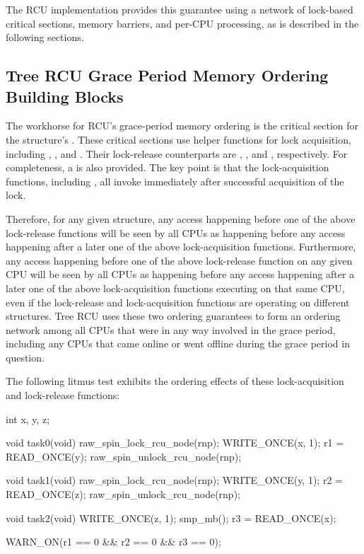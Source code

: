 The RCU implementation provides this guarantee using a network
of lock-based critical sections, memory barriers, and per-CPU
processing, as is described in the following sections.

\subsection{Tree RCU Grace Period Memory Ordering Building Blocks}

The workhorse for RCU's grace-period memory ordering is the
critical section for the  structure's
.
These critical sections use helper functions for lock
acquisition, including ,
, and .
Their lock-release counterparts are ,
, and
, respectively.
For completeness, a  is also provided.
The key point is that the lock-acquisition functions, including
, all invoke 
immediately after successful acquisition of the lock.

Therefore, for any given  structure, any access
happening before one of the above lock-release functions will be seen
by all CPUs as happening before any access happening after a later
one of the above lock-acquisition functions.
Furthermore, any access happening before one of the
above lock-release function on any given CPU will be seen by all
CPUs as happening before any access happening after a later one
of the above lock-acquisition functions executing on that same CPU,
even if the lock-release and lock-acquisition functions are operating
on different  structures.
Tree RCU uses these two ordering guarantees to form an ordering
network among all CPUs that were in any way involved in the grace
period, including any CPUs that came online or went offline during
the grace period in question.

The following litmus test exhibits the ordering effects of these
lock-acquisition and lock-release functions:

\begin{VerbatimN}
	int x, y, z;

	void task0(void)
	{
		raw_spin_lock_rcu_node(rnp);
		WRITE_ONCE(x, 1);
		r1 = READ_ONCE(y);
		raw_spin_unlock_rcu_node(rnp);
	}

	void task1(void)
	{
		raw_spin_lock_rcu_node(rnp);
		WRITE_ONCE(y, 1);
		r2 = READ_ONCE(z);
		raw_spin_unlock_rcu_node(rnp);
	}

	void task2(void)
	{
		WRITE_ONCE(z, 1);
		smp_mb();
		r3 = READ_ONCE(x);
	}

	WARN_ON(r1 == 0 && r2 == 0 && r3 == 0);
\end{VerbatimN}

